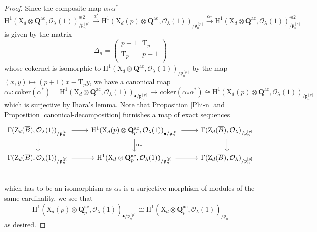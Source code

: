 \documentclass[10pt]{amsart}
\numberwithin{equation}{section}
\theoremstyle{plain}
\numberwithin{equation}{section}
\theoremstyle{definition}
\theoremstyle{remark}
\def\coker{\mathrm{coker}}
\def\ac{\mathrm{ac}}
\def\Qbar{\QQ^{\ac}}
\def\ac{\mathrm{ac}}
\def\calO{\mathcal{O}}
\def\frakp{\mathfrak{p}}
\def\QQ{\mathbf{Q}}
\def\rmH{\mathrm{H}}
\def\rmX{\mathrm{X}}
\def\rmT{\mathrm{T}}
\def\rmZ{\mathrm{Z}}
\begin{document}
\begin{proof}
Since the composite map $\alpha_{\ast}\alpha^{\ast}$
\begin{equation*}
\rmH^{1}({\rmX}_{d}\otimes{\Qbar}, \calO_{\lambda}(1))^{\oplus2}_{/\frakp^{[p]}_{n}}\xrightarrow{\alpha^{\ast}} \rmH^{1}(\rmX_{d}(p)\otimes{\Qbar}, \calO_{\lambda}(1))_{/\frakp^{[p]}_{n}}\xrightarrow{\alpha_{\ast}} \rmH^{1}({\rmX}_{d}\otimes{\Qbar}, \calO_{\lambda}(1))^{\oplus2}_{/\frakp^{[p]}_{n}}
\end{equation*}
is given by the matrix
\begin{equation*}
\Delta_{n}=
\begin{pmatrix}
p+1 &   \rmT_{p}\\
\rmT_{p} & p+1\\ 
\end{pmatrix}
\end{equation*}
whose cokernel is isomorphic to $\rmH^{1}({\rmX}_{d}\otimes{\Qbar}, \calO_{\lambda}(1))_{/\frakp^{[p]}_{n}}$ by the map $(x, y)\mapsto (p+1)x-\rmT_{p}y$, we have a canonical map 
\begin{equation*}
\alpha_{\ast}: \coker(\alpha^{\ast})=\rmH^{1}({\rmX}_{d}\otimes{\Qbar}, \calO_{\lambda}(1))_{\bullet/\frakp^{[p]}_{n}} \rightarrow \coker(\alpha_{\ast}\alpha^{\ast})\cong\rmH^{1}(\rmX_{d}(p)\otimes{\Qbar}, \calO_{\lambda}(1))_{/\frakp^{[p]}_{n}} 
\end{equation*}
which is surjective by Ihara's lemma. Note that Proposition \ref{Phi-n} and Proposition \ref{canonical-decomposition} furnishes a map of exact sequences
\begin{equation*}
\begin{tikzcd}
\Gamma(\rmZ_{d}(\overline{B}), \calO_{\lambda}(1))_{/\frakp^{[p]}_{n}} \arrow[r] \arrow[d]      & \rmH^{1}({\rmX}_{d}(p)\otimes{\QQ^{\ac}_{p}}, \calO_{\lambda}(1))_{\bullet/\frakp^{[p]}_{n}} \arrow[r] \arrow[d, "\alpha_{\ast}"] & \Gamma(\rmZ_{d}(\overline{B}), \calO_{\lambda})_{/\frakp^{[p]}_{n}} \arrow[d] \\
\Gamma(\rmZ_{d}(\overline{B}), \calO_{\lambda}(1))_{/\frakp^{[p]}_{n}} \arrow[r] & \rmH^{1}({\rmX}_{d}\otimes {\QQ^{\ac}_{p}}, \calO_{\lambda}(1))_{/\frakp^{[p]}_{n}}\arrow[r] & \Gamma(\rmZ_{d}(\overline{B}), \calO_{\lambda})_{/\frakp^{[p]}_{n}}\\  
\end{tikzcd}
\end{equation*}
which has to be an isomorphism as $\alpha_{\ast}$ is a surjective morphism of modules of the same cardinality, we see that 
\begin{equation*}
\rmH^{1}(\rmX_{d}(p)\otimes{\Qbar_{p}}, \calO_{\lambda}(1))_{\bullet/\frakp^{[p]}_{n}}\cong \rmH^{1}(\rmX_{d}\otimes{\Qbar_{p}}, \calO_{\lambda}(1))_{/\frakp_{n}}
\end{equation*}
as desired. 
\end{proof}
\end{document}
